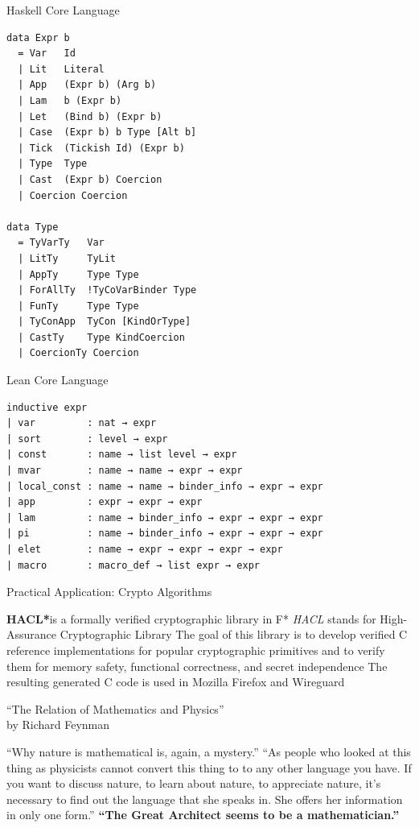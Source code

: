 \documentclass[pdf]{beamer}
\begin{document}
\begin{frame}[fragile]{Haskell Core Language}
  \begin{verbatim}
data Expr b
  = Var   Id
  | Lit   Literal
  | App   (Expr b) (Arg b)
  | Lam   b (Expr b)
  | Let   (Bind b) (Expr b)
  | Case  (Expr b) b Type [Alt b]
  | Tick  (Tickish Id) (Expr b)
  | Type  Type
  | Cast  (Expr b) Coercion
  | Coercion Coercion

data Type
  = TyVarTy   Var
  | LitTy     TyLit
  | AppTy     Type Type
  | ForAllTy  !TyCoVarBinder Type
  | FunTy     Type Type
  | TyConApp  TyCon [KindOrType]
  | CastTy    Type KindCoercion
  | CoercionTy Coercion
  \end{verbatim}
\end{frame}

\begin{frame}[fragile]{Lean Core Language}
  \begin{verbatim}
inductive expr
| var         : nat → expr
| sort        : level → expr
| const       : name → list level → expr
| mvar        : name → name → expr → expr
| local_const : name → name → binder_info → expr → expr
| app         : expr → expr → expr
| lam         : name → binder_info → expr → expr → expr
| pi          : name → binder_info → expr → expr → expr
| elet        : name → expr → expr → expr → expr
| macro       : macro_def → list expr → expr
  \end{verbatim}
\end{frame}

\begin{frame}{Practical Application: Crypto Algorithms}
  \begin{outline}
    \1 \textbf{HACL*}\footnotemark[5] is a formally verified cryptographic library in F*
    \1 {\em HACL} stands for High-Assurance Cryptographic Library
    \1 The goal of this library is to develop verified C reference implementations for popular cryptographic primitives and to verify them for memory safety, functional correctness, and secret independence
    \1 The resulting generated C code is used in Mozilla Firefox and Wireguard
  \end{outline}
\end{frame}

\begin{frame}{``The Relation of Mathematics and Physics''\footnotemark[6] \\ by Richard Feynman}
  \small
  \begin{outline}
    \1 ``Why nature is mathematical is, again, a mystery.''
    \1 ``As people who looked at this thing as physicists cannot convert this thing to to any other language you have. If you want to discuss nature, to learn about nature, to appreciate nature, it's necessary to find out the language that she speaks in. She offers her information in only one form.''
    \1 \textbf{``The Great Architect seems to be a mathematician.''}
  \end{outline}
\end{frame}
\end{document}
